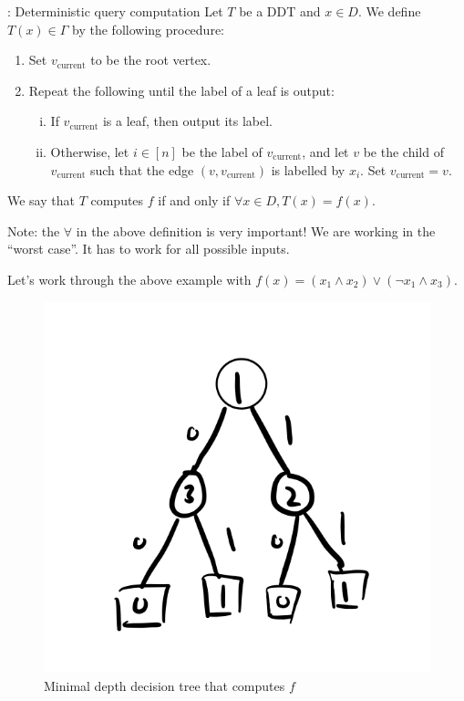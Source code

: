 \begin{defbox}{: Deterministic query computation}{}
    Let $T$ be a DDT and $x \in D$. We define $T(x) \in \Gamma$ by the following procedure:
    \begin{enumerate}
        \item Set $v_{\text{current}}$ to be the root vertex.
        \item Repeat the following until the label of a leaf is output:
        \begin{enumerate}[(i)]
            \item If $v_{\text{current}}$ is a leaf, then output its label.
            \item Otherwise, let $i \in [n]$ be the label of $v_{\text{current}}$, and let $v$ be the child of $v_{\text{current}}$ such that the edge $(v, v_{\text{current}})$ is labelled by $x_i$. Set $v_{\text{current}} = v$. 
        \end{enumerate}
    \end{enumerate}
    We say that $T$ computes $f$ if and only if $\forall x \in D, T(x) = f(x)$. 
\end{defbox}
Note: the $\forall$ in the above definition is very important! We are working in the ``worst case''. It has to work for all possible inputs. 

Let's work through the above example with $f(x) = (x_1 \land x_2) \lor (\lnot x_1 \land x_3)$. 

\begin{figure}[htbp!]
    \centering
    \includegraphics[scale=0.8]{Images/fig-lec1-dtree.png}
    \caption{Minimal depth decision tree that computes $f$}
    \label{lec1-dtree}
\end{figure}

